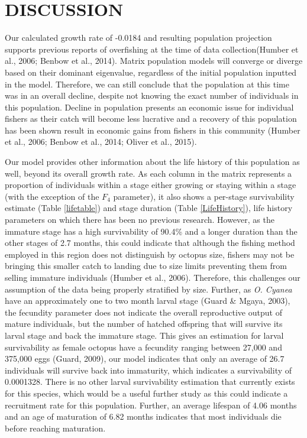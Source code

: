\documentclass[
]{article}
\begin{document}
\hypertarget{discussion}{%
\section{DISCUSSION}\label{discussion}}

Our calculated growth rate of -0.0184 and resulting population projection supports previous reports of overfishing at the time of data collection(Humber et al., 2006; Benbow et al., 2014). Matrix population models will converge or diverge based on their dominant eigenvalue, regardless of the initial population inputted in the model. Therefore, we can still conclude that the population at this time was in an overall decline, despite not knowing the exact number of individuals in this population. Decline in population presents an economic issue for individual fishers as their catch will become less lucrative and a recovery of this population has been shown result in economic gains from fishers in this community (Humber et al., 2006; Benbow et al., 2014; Oliver et al., 2015).

Our model provides other information about the life history of this population as well, beyond its overall growth rate. As each column in the matrix represents a proportion of individuals within a stage either growing or staying within a stage (with the exception of the \(F_4\) parameter), it also shows a per-stage survivability estimate (Table \ref{lifetable}) and stage duration (Table \ref{LifeHistory}), life history parameters on which there has been no previous research. However, as the immature stage has a high survivability of 90.4\% and a longer duration than the other stages of 2.7 months, this could indicate that although the fishing method employed in this region does not distinguish by octopus size, fishers may not be bringing this smaller catch to landing due to size limits preventing them from selling immature individuals (Humber et al., 2006). Therefore, this challenges our assumption of the data being properly stratified by size. Further, as \emph{O. Cyanea} have an approximately one to two month larval stage (Guard \& Mgaya, 2003), the fecundity parameter does not indicate the overall reproductive output of mature individuals, but the number of hatched offspring that will survive its larval stage and back the immature stage. This gives an estimation for larval survivability as female octopus have a fecundity ranging between 27,000 and 375,000 eggs (Guard, 2009), our model indicates that only an average of 26.7 individuals will survive back into immaturity, which indicates a survivability of 0.0001328. There is no other larval survivability estimation that currently exists for this species, which would be a useful further study as this could indicate a recruitment rate for this population. Further, an average lifespan of 4.06 months and an age of maturation of 6.82 months indicates that most individuals die before reaching maturation.
\end{document}
